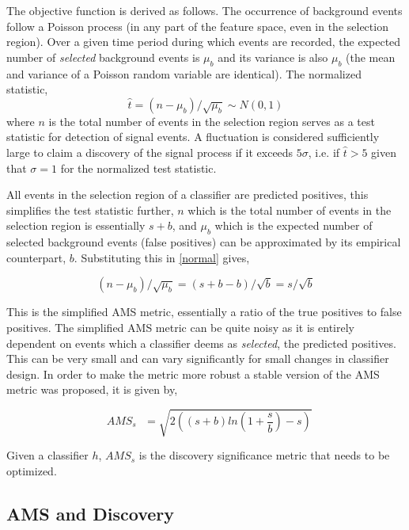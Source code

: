\documentclass[final,3p,times,twocolumn]{elsarticle}
\begin{document}
The objective function is derived as follows. The occurrence of background events follow a Poisson process (in any part of the feature space, even in the selection region). Over a given time period during which events are recorded, the expected number of \textit{selected} background events is $\mu_{b}$ and its variance is also $\mu_{b}$ (the mean and variance of a Poisson random variable are identical). The normalized statistic,  \begin{equation} \hat{t} = (n-\mu_{b})/\sqrt{\mu_{b}} \sim N(0,1) \label{normal}\end{equation} where $n$ is the total number of events in the selection region serves as a test statistic for detection of signal events. A fluctuation is considered sufficiently large to claim a discovery of the signal process if it exceeds $5\sigma$, i.e. if $\hat{t} > 5$ given that $\sigma = 1$ for the normalized test statistic.

All events in the selection region of a classifier are predicted positives, this simplifies the test statistic further, $n$ which is the total number of events in the selection region is essentially $s +b$, and $\mu_{b}$ which is the expected number of selected background events (false positives) can be approximated by its empirical counterpart, $b$. Substituting this in \ref{normal} gives, 

\begin{equation}
(n-\mu_{b})/\sqrt{\mu_{b}} = ( s + b - b)/\sqrt{b} = s/\sqrt{b}
\end{equation}

This is the simplified AMS metric, essentially a ratio of the true positives to false positives. The simplified AMS metric can be quite noisy as it is entirely dependent on events which a classifier deems as \textit{selected}, the predicted positives. This can be very small and can vary significantly for small changes in classifier design. In order to make the metric more robust a stable version of the AMS metric was proposed, it is given by,  

\begin{equation}
 \textrm{ $AMS_{s}$ } = \sqrt{2((s + b)ln(1 + \frac{s}{b})-s)} 
\label{AMS} 
\end{equation}
\raisetag{-.4em}

Given a classifier $h$, $AMS_{s}$ is the discovery significance metric that needs to be optimized.

\subsection{AMS and Discovery}
\end{document}
